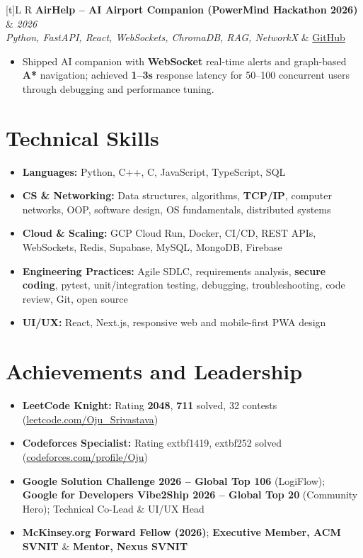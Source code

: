 \documentclass[a4paper,10pt]{article}
\newcommand{\resumeProject}[4]{
  \vspace{0.5mm}
  \noindent
  \begin{tabularx}{\textwidth}[t]{L R}
    \textbf{#1} & \textit{#3} \\
    \textit{#2} & #4 \\
  \end{tabularx}
  \vspace{-0.5mm}
}
\begin{document}
\resumeProject
  {AirHelp -- AI Airport Companion (PowerMind Hackathon 2026)}
  {Python, FastAPI, React, WebSockets, ChromaDB, RAG, NetworkX}
  {2026}
  {\href{https://github.com/Ojas-Srivastava05/AirHelp-AI-Airport-Assistant}{GitHub}}
\begin{itemize}
  \item Shipped AI companion with \textbf{WebSocket} real-time alerts and graph-based \textbf{A*} navigation; achieved \textbf{1--3s} response latency for 50--100 concurrent users through debugging and performance tuning.
\end{itemize}

\section{Technical Skills}
\small
\begin{itemize}[label={}]
  \item \textbf{Languages:} Python, C++, C, JavaScript, TypeScript, SQL
  \item \textbf{CS \& Networking:} Data structures, algorithms, \textbf{TCP/IP}, computer networks, OOP, software design, OS fundamentals, distributed systems
  \item \textbf{Cloud \& Scaling:} GCP Cloud Run, Docker, CI/CD, REST APIs, WebSockets, Redis, Supabase, MySQL, MongoDB, Firebase
  \item \textbf{Engineering Practices:} Agile SDLC, requirements analysis, \textbf{secure coding}, pytest, unit/integration testing, debugging, troubleshooting, code review, Git, open source
  \item \textbf{UI/UX:} React, Next.js, responsive web and mobile-first PWA design
\end{itemize}

\section{Achievements and Leadership}
\small
\begin{itemize}
  \item \textbf{LeetCode Knight:} Rating \textbf{2048}, \textbf{711} solved, 32 contests (\href{https://leetcode.com/Oju_Srivastava}{leetcode.com/Oju\_Srivastava})
  \item \textbf{Codeforces Specialist:} Rating 	extbf{1419}, 	extbf{252} solved (\href{https://codeforces.com/profile/Oju}{codeforces.com/profile/Oju})
  \item \textbf{Google Solution Challenge 2026 -- Global Top 106} (LogiFlow); \textbf{Google for Developers Vibe2Ship 2026 -- Global Top 20} (Community Hero); Technical Co-Lead \& UI/UX Head
  \item \textbf{McKinsey.org Forward Fellow (2026)}; \textbf{Executive Member, ACM SVNIT} \& \textbf{Mentor, Nexus SVNIT}
\end{itemize}
\end{document}
